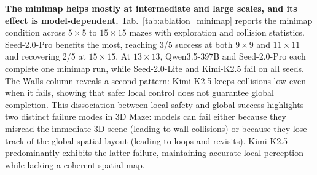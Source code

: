 

\noindent\textbf{The minimap helps mostly at intermediate and large scales, and its effect is model-dependent.}
Tab.~\ref{tab:ablation_minimap} reports the minimap condition across $5{\times}5$ to $15{\times}15$ mazes with exploration and collision statistics. Seed-2.0-Pro benefits the most, reaching 3/5 success at both $9{\times}9$ and $11{\times}11$ and recovering 2/5 at $15{\times}15$. At $13{\times}13$, Qwen3.5-397B and Seed-2.0-Pro each complete one minimap run, while Seed-2.0-Lite and Kimi-K2.5 fail on all seeds. The Walls column reveals a second pattern: Kimi-K2.5 keeps collisions low even when it fails, showing that safer local control does not guarantee global completion. This dissociation between local safety and global success highlights two distinct failure modes in 3D Maze: models can fail either because they misread the immediate 3D scene (leading to wall collisions) or because they lose track of the global spatial layout (leading to loops and revisits). Kimi-K2.5 predominantly exhibits the latter failure, maintaining accurate local perception while lacking a coherent spatial map.



